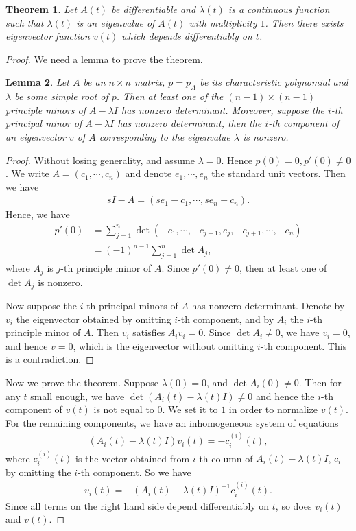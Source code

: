 \documentclass[11pt]{book}
\newtheorem{theorem}{Theorem}[chapter]
\newtheorem{lemma}[theorem]{Lemma}
\theoremstyle{definition}
\numberwithin{equation}{chapter}
\begin{document}
\begin{theorem}
Let $A(t)$ be differentiable and $\lambda(t)$ is a continuous function such that $\lambda(t)$ is an eigenvalue of $A(t)$ with multiplicity $1$. Then there exists eigenvector function $v(t)$ which depends differentiably on $t$. 
\end{theorem}
\begin{proof}
We need a lemma to prove the theorem.
\begin{lemma}
Let $A$ be an $n\times n$ matrix, $p = p_A$ be its characteristic polynomial and $\lambda$ be some simple root of $p$. Then at least one of the $(n-1)\times(n-1)$ principle minors of $A - \lambda I$ has nonzero determinant. Moreover, suppose the $i$-th principal minor of $A - \lambda I$ has nonzero determinant, then the $i$-th component of an eigenvector $v$ of $A$ corresponding to the eigenvalue $\lambda$ is nonzero.
\end{lemma}
\begin{proof}
Without losing generality, and assume $\lambda = 0$. Hence $p(0) = 0, p'(0) \neq 0$. We write $A = (c_1, \cdots, c_n)$ and denote $e_1, \cdots, e_n$ the standard unit vectors. Then we have
\begin{align*}
    s I - A = (se_1 - c_1, \cdots, se_n - c_n).
\end{align*}
Hence, we have
\begin{align*}
    p'(0) & = \sum^n_{j=1} \det (-c_1, \cdots, -c_{j-1}, e_j, -c_{j+1},\cdots, -c_n) \\
    & = (-1)^{n-1} \sum^n_{j=1} \det A_j,
\end{align*}
where $A_j$ is $j$-th principle minor of $A$. Since $p'(0) \neq 0$, then at least one of $\det A_j$ is nonzero.

Now suppose the $i$-th principal minors of $A$ has nonzero determinant. Denote by $v_i$ the eigenvector obtained by omitting $i$-th component, and by $A_i$ the $i$-th principle minor of $A$. Then $v_i$ satisfies $A_i v_i = 0$. Since $\det A_i \neq 0$, we have $v_i = 0$, and hence $v = 0$, which is the eigenvector without omitting $i$-th component. This is a contradiction.
\end{proof}

Now we prove the theorem. Suppose $\lambda(0) = 0$, and $\det A_i(0) \neq 0$. Then for any $t$ small enough, we have $\det (A_i(t) - \lambda(t)I) \neq 0$ and hence the $i$-th component of $v(t)$ is not equal to $0$. We set it to $1$ in order to normalize $v(t)$. For the remaining components, we have an inhomogeneous system of equations 
\begin{align*}
    \left(A_i(t) - \lambda(t)I \right) v_i(t) = - c_i^{(i)}(t),
\end{align*}
where $c_i^{(i)}(t)$ is the vector obtained from $i$-th column of $A_i(t) - \lambda(t)I$, $c_i$ by omitting the $i$-th component. So we have 
\begin{align*}
    v_i(t) = - \left(A_i(t) - \lambda(t)I \right)^{-1} c_i^{(i)}(t).
\end{align*}
Since all terms on the right hand side depend differentiably on $t$, so does $v_i(t)$ and $v(t)$. 
\end{proof}
\end{document}
